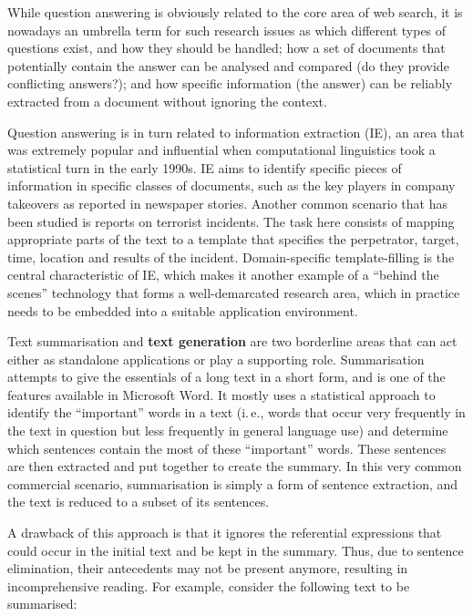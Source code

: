 \begin{multicols}{2}
While question answering is obviously related to the core area of web search, it is nowadays an umbrella term for such research issues as which different types of questions exist, and how they should be handled; how a set of documents that potentially contain the answer can be analysed and compared (do they provide conflicting answers?); and how specific information (the answer) can be reliably extracted from a document without ignoring the context. 

Question answering is in turn related to information extraction (IE), an area that was extremely popular and influential when computational linguistics took a statistical turn in the early 1990s. IE aims to identify specific pieces of information in specific classes of documents, such as the key players in company takeovers as reported in newspaper stories. Another common scenario that has been studied is reports on terrorist incidents. The task here consists of mapping appropriate parts of the text to a template that specifies the perpetrator, target, time, location and results of the incident. Domain-specific template-filling is the central characteristic of IE, which makes it another example of a “behind the scenes” technology that forms a well-demarcated research area, which in practice needs to be embedded into a suitable application environment. 



Text summarisation and \textbf{text generation} are two borderline areas that can act either as standalone applications or play a supporting role. Summarisation attempts to give the essentials of a long text in a short form, and is one of the features available in Microsoft Word. It mostly uses a statistical approach to identify the “important” words in a text (i.\,e., words that occur very frequently in the text in question but less frequently in general language use) and determine which sentences contain the most of these “important” words. These sentences are then extracted and put together to create the summary. In this very common commercial scenario, summarisation is simply a form of sentence extraction, and the text is reduced to a subset of its sentences. 

A drawback of this approach is that it ignores the referential expressions that could occur in the initial text and be kept in the summary. Thus, due to sentence elimination, their antecedents may not be present anymore, resulting in incomprehensive reading. For example, consider the following text to be summarised:


\end{multicols}
